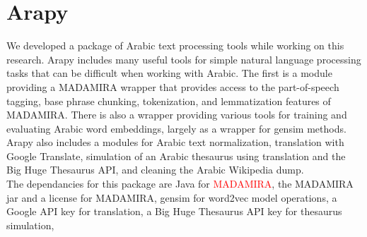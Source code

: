 \section{Arapy}
\label{sec:arapy}

We developed a package of Arabic text processing tools while working on this research. Arapy includes many useful tools for simple natural language processing tasks that can be difficult when working with Arabic. The first is a module providing a MADAMIRA wrapper that provides access to the part-of-speech tagging, base phrase chunking, tokenization, and lemmatization features of MADAMIRA. There is also a wrapper providing various tools for training and evaluating Arabic word embeddings, largely as a wrapper for gensim methods. Arapy also includes a modules for Arabic text normalization, translation with Google Translate, simulation of an Arabic thesaurus using translation and the Big Huge Thesaurus API, and cleaning the Arabic Wikipedia dump.
\\
The dependancies for this package are Java for \textcolor{red}{MADAMIRA}, the MADAMIRA jar and a license for MADAMIRA, gensim for word2vec model operations, a Google API key for translation, a Big Huge Thesaurus API key for thesaurus simulation, 
